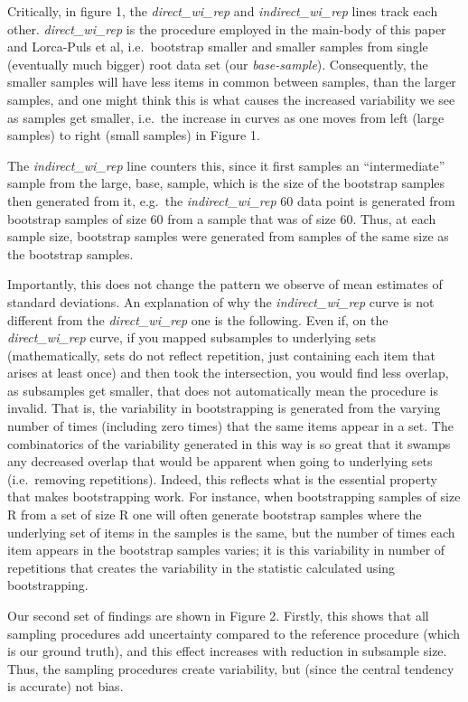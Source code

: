 \documentclass[
]{article}
\begin{document}
Critically, in figure 1, the \emph{direct\_wi\_rep} and
\emph{indirect\_wi\_rep} lines track each other. \emph{direct\_wi\_rep}
is the procedure employed in the main-body of this paper and Lorca-Puls
et al, i.e.~bootstrap smaller and smaller samples from single
(eventually much bigger) root data set (our \emph{base-sample}).
Consequently, the smaller samples will have less items in common between
samples, than the larger samples, and one might think this is what
causes the increased variability we see as samples get smaller, i.e.~the
increase in curves as one moves from left (large samples) to right
(small samples) in Figure 1.

The \emph{indirect\_wi\_rep} line counters this, since it first samples
an ``intermediate'' sample from the large, base, sample, which is the
size of the bootstrap samples then generated from it, e.g.~the
\emph{indirect\_wi\_rep} 60 data point is generated from bootstrap
samples of size 60 from a sample that was of size 60. Thus, at each
sample size, bootstrap samples were generated from samples of the same
size as the bootstrap samples.

Importantly, this does not change the pattern we observe of mean
estimates of standard deviations. An explanation of why the
\emph{indirect\_wi\_rep} curve is not different from the
\emph{direct\_wi\_rep} one is the following. Even if, on the
\emph{direct\_wi\_rep} curve, if you mapped subsamples to underlying
sets (mathematically, sets do not reflect repetition, just containing
each item that arises at least once) and then took the intersection, you
would find less overlap, as subsamples get smaller, that does not
automatically mean the procedure is invalid. That is, the variability in
bootstrapping is generated from the varying number of times (including
zero times) that the same items appear in a set. The combinatorics of
the variability generated in this way is so great that it swamps any
decreased overlap that would be apparent when going to underlying sets
(i.e.~removing repetitions). Indeed, this reflects what is the essential
property that makes bootstrapping work. For instance, when bootstrapping
samples of size R from a set of size R one will often generate bootstrap
samples where the underlying set of items in the samples is the same,
but the number of times each item appears in the bootstrap samples
varies; it is this variability in number of repetitions that creates the
variability in the statistic calculated using bootstrapping.

Our second set of findings are shown in Figure 2. Firstly, this shows
that all sampling procedures add uncertainty compared to the reference
procedure (which is our ground truth), and this effect increases with
reduction in subsample size. Thus, the sampling procedures create
variability, but (since the central tendency is accurate) not bias.
\end{document}
